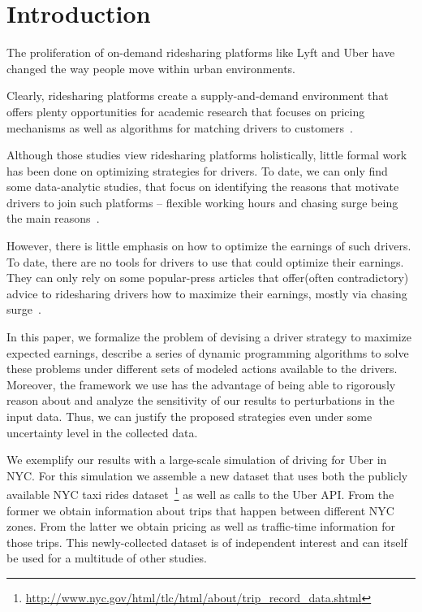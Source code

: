 
\section{Introduction}
\label{sec:introduction}

The proliferation of on-demand ridesharing platforms like Lyft and Uber
have changed the way people move within urban environments. 


Clearly, ridesharing platforms create a supply-and-demand environment that offers 
plenty opportunities for academic research that focuses on pricing mechanisms
as well as algorithms for matching drivers to 
customers~\cite{banerjee2015pricing,ozkan2016dynamic}.

Although those studies view ridesharing platforms holistically, little formal work
has been done on optimizing strategies for drivers. To date, we can only find some data-analytic studies, that focus on identifying the reasons that motivate drivers to join such platforms -- flexible working hours and chasing surge being the main reasons~\cite{chen2015peeking,chen2016dynamic,hall2016analysis}.

However, there is little emphasis on how to optimize the earnings of such drivers.
To date, there are no tools for drivers to use that could optimize their earnings.
They can only rely on some 
popular-press articles that offer(often contradictory) advice to ridesharing drivers how to maximize their earnings, mostly via chasing surge~\cite{dont,tips}. 

 In this paper, we formalize the problem of devising a driver strategy to maximize expected 
 earnings, describe a series of dynamic programming algorithms to solve these problems
 under different sets of modeled actions available to the drivers. 
 Moreover, the framework we use has the advantage of being able to rigorously reason about  and analyze the sensitivity of our results to perturbations in the input data. 
 Thus, we can justify the proposed strategies even under some uncertainty level in the
 collected data.
  
We exemplify our  results with a large-scale simulation of driving for Uber in NYC. For this simulation we assemble a new dataset that uses both the publicly available NYC taxi rides 
dataset~\footnote{\url{http://www.nyc.gov/html/tlc/html/about/trip_record_data.shtml}} as well as calls to the Uber API. From the former we obtain information about trips that happen between different NYC zones. From the latter we obtain pricing as well as traffic-time information for those trips. This newly-collected dataset is of independent interest and can itself be used for a multitude of other studies.

